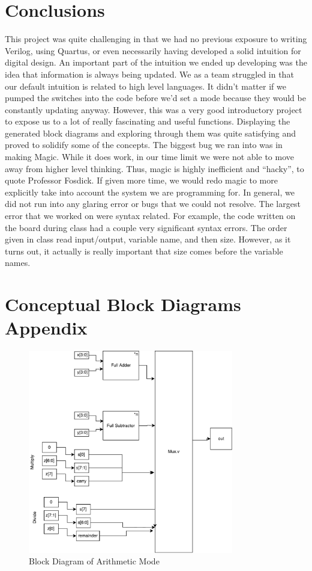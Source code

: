 \documentclass[11pt]{article}
\begin{document}
\section{Conclusions}
This project was quite challenging in that we had no previous exposure to writing Verilog, using Quartus, or even necessarily having developed a solid intuition for digital design. An important part of the intuition we ended up developing was the idea that information is always being updated. We as a team struggled in that our default intuition is related to high level languages. It didn't matter if we pumped the switches into the code before we'd set a mode because they would be constantly updating anyway. However, this was a very good introductory project to expose us to a lot of really fascinating and useful functions. Displaying the generated block diagrams and exploring through them was quite satisfying and proved to solidify some of the concepts. The biggest bug we ran into was in making Magic. While it does work, in our time limit we were not able to move away from higher level thinking. Thus, magic is highly inefficient and ``hacky'', to quote Professor Fosdick. If given more time, we would redo magic to more explicitly take into account the system we are programming for. In general, we did not run into any glaring error or bugs that we could not resolve. The largest error that we worked on were syntax related. For example, the code written on the board during class had a couple very significant syntax errors. The order given in class read input/output, variable name, and then size. However, as it turns out, it actually is really important that size comes before the variable names.



\section{Conceptual Block Diagrams Appendix}
\begin{figure}[H]
    \centering
    \includegraphics[clip, trim=0cm 0cm 0cm 0cm, width=0.8\textwidth]{Arithmetic_BD.pdf}
    \caption{Block Diagram of Arithmetic Mode}
    \label{fig:arithmeticdrawn}
\end{figure}
\end{document}
